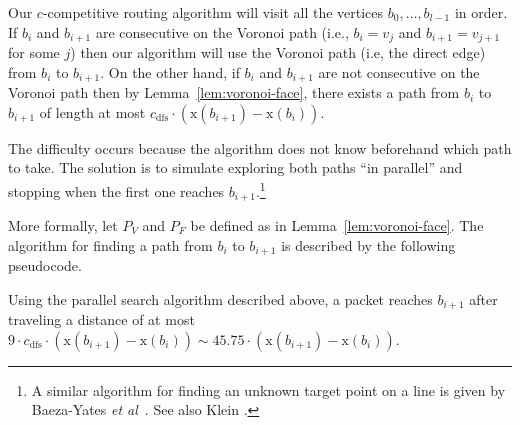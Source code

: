 \documentclass[final]{siamltex}
\newcommand{\etal}{{\em et al\/}}
\newcommand{\lemlabel}[1]{\label{lem:#1}}
\newcommand{\lemref}[1]{Lemma~\ref{lem:#1}}
\newcommand{\x}{\mathrm{x}}
\newcommand{\dist}{\mathit{dist}}
\newcommand{\cdfs}{c_\mathrm{dfs}}
\begin{document}
Our $c$-competitive routing algorithm will visit all the vertices
$b_0,\ldots,b_{l-1}$ in order.  If $b_i$ and $b_{i+1}$ are consecutive
on the Voronoi path (i.e., $b_i=v_j$ and $b_{i+1}=v_{j+1}$ for some
$j$) then our algorithm will use the Voronoi path (i.e, the direct
edge) from $b_i$ to $b_{i+1}$.  On the other hand, if $b_i$ and
$b_{i+1}$ are not consecutive on the Voronoi path then by
\lemref{voronoi-face}, there exists a path from $b_i$ to $b_{i+1}$ of
length at most $\cdfs\cdot(\x(b_{i+1})-\x(b_{i}))$.

The difficulty occurs because the algorithm does not know beforehand
which path to take.  The solution is to simulate exploring both paths
``in parallel'' and stopping when the first one reaches
$b_{i+1}$.\footnote{A similar algorithm for finding an unknown target
point on a line is given by \mbox{Baeza-Yates} \etal\ \cite{bcr93}.
See also Klein \cite{k92}.}

More formally, let $P_V$ and $P_F$ be defined as in
\lemref{voronoi-face}.  The algorithm for finding a path from $b_i$ to
$b_{i+1}$ is described by the following pseudocode.

\vspace{1ex}
\begin{algorithmic}[1]
\STATE{$j\leftarrow 0$, $l_0\leftarrow\min\{\dist(p_0,p_1),\dist(q_0,q_1)\}$.}

\REPEAT






\end{algorithmic}

\begin{lemma}\lemlabel{parallel-search}
Using the parallel search algorithm described above, a packet reaches
$b_{i+1}$ after traveling a distance of at most
$9\cdot\cdfs\cdot(\x(b_{i+1})-\x(b_i)) \sim 45.75\cdot(\x(b_{i+1})-\x(b_i))$.
\end{lemma}
\end{document}
